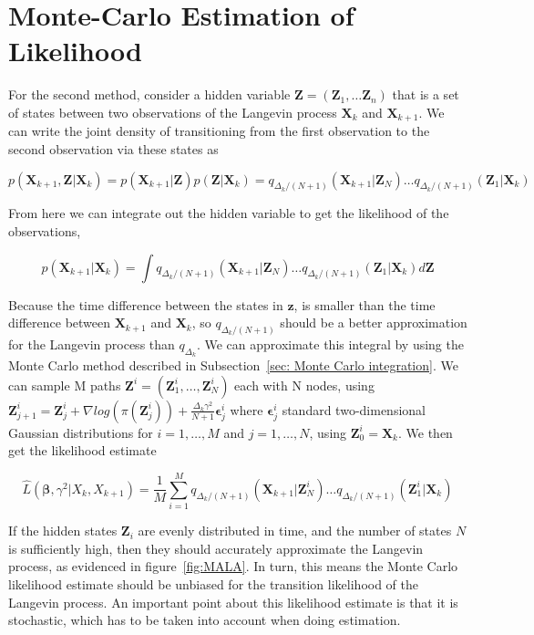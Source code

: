 \section{Monte-Carlo Estimation of Likelihood}
\label{sec: Monte Carlo Estimation}
For the second method, consider a hidden variable $\textbf{Z} = (\textbf{Z}_1, \dots \textbf{Z}_n)$ that is a set of states between two observations of the Langevin process $\textbf{X}_k$ and $\textbf{X}_{k+1}$. We can write the joint density of transitioning from the first observation to the second observation via these states as 

$$p(\textbf{X}_{k+1}, \textbf{Z} | \textbf{X}_k) = p(\textbf{X}_{k+1}|\textbf{Z})p(\textbf{Z}|\textbf{X}_k) = q_{\Delta_k/(N+1)}(\textbf{X}_{k+1}|\textbf{Z}_N)\dots q_{\Delta_k/(N+1)}(\textbf{Z}_1|\textbf{X}_k)$$ 

From here we can integrate out the hidden variable to get the likelihood of the observations, 


$$p(\textbf{X}_{k+1}|\textbf{X}_k) = \int q_{\Delta_k/(N+1)}(\textbf{X}_{k+1}|\textbf{Z}_N)\dots q_{\Delta_k/(N+1)}(\textbf{Z}_1|\textbf{X}_k)d\textbf{Z}$$

Because the time difference between the states in $\textbf{z}$, is smaller than the time difference between $\textbf{X}_{k+1}$ and $\textbf{X}_k$, so $q_{\Delta_k/(N+1)}$ should be a better approximation for the Langevin process than $q_{\Delta_k}$. We can approximate this integral by using the Monte Carlo method described in Subsection~\ref{sec: Monte Carlo integration}. We can sample M paths $\textbf{Z}^i = (\textbf{Z}_1^i, \dots,\textbf{Z}_N^i)$ each with N nodes, using $\textbf{Z}_{j+1}^i = \textbf{Z}_j^i + \nabla log(\pi(\textbf{Z}_j^i)) + \frac{\Delta_k\gamma^2}{N+1}\bm \epsilon_j^i$ where $\bm \epsilon_j^i$ standard two-dimensional Gaussian distributions for $i=1, \dots , M$ and $j = 1,\dots , N$, using $\textbf{Z}_0^i = \textbf{X}_k$. We then get the likelihood estimate

$$
\hat{L}(\bm \beta , \gamma^2|X_k, X_{k+1}) =  \frac{1}{M}\sum_{i=1}^M q_{\Delta_k/(N+1)}(\textbf{X}_{k+1}|\textbf{Z}^i_N)\dots q_{\Delta_k/(N+1)}(\textbf{Z}^i_1|\textbf{X}_k)
\label{eq: montecarlo likelihood}
$$

If the hidden states $\textbf{Z}_i$ are evenly distributed in time, and the number of states $N$ is sufficiently high, then they should accurately approximate the Langevin process, as evidenced in figure~\ref{fig:MALA}. In turn, this means the Monte Carlo likelihood estimate should be unbiased for the transition likelihood of the Langevin process. An important point about this likelihood estimate is that it is stochastic, which has to be taken into account when doing estimation. 

